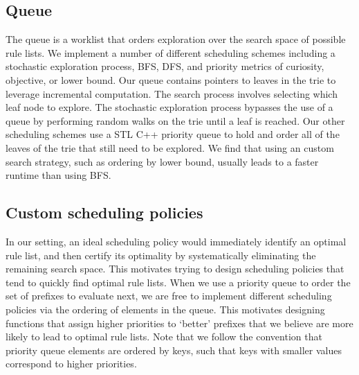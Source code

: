 \subsection{Queue}
\label{sec:queue}

The queue is a worklist that orders exploration over the search space of possible rule lists.
We implement a number of different scheduling schemes including a stochastic exploration process, BFS, DFS, and priority metrics of curiosity, objective, or lower bound.
Our queue contains pointers to leaves in the trie to leverage incremental computation.
The search process involves selecting which leaf node to explore.
The stochastic exploration process bypasses the use of a queue by performing random walks on the trie until a leaf is reached.
Our other scheduling schemes use a STL C++ priority queue to hold and order all of the leaves of the trie that still need to be explored.
We find that using an custom search strategy, such as ordering by lower bound, usually leads to a faster runtime than using BFS.

\subsection{Custom scheduling policies}
\label{sec:scheduling}

In our setting, an ideal scheduling policy would immediately identify an optimal
rule list, and then certify its optimality by systematically eliminating the
remaining search space.
%
This motivates trying to design scheduling policies that tend to quickly find optimal rule lists.
%
When we use a priority queue to order the set of prefixes to evaluate next,
we are free to implement different scheduling policies via the ordering of
elements in the queue.
%
This motivates designing functions that assign higher priorities to `better'
prefixes that we believe are more likely to lead to optimal rule lists.
%
Note that we follow the convention that priority queue elements are ordered
by keys, such that keys with smaller values correspond to higher priorities.

